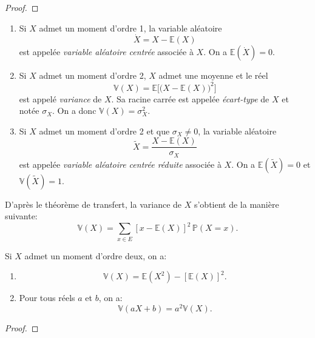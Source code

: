 \begin{proof}
		\pl{ \rep{5cm}}
	\end{proof}
\sld{\vfill\pagebreak[5]}%
\begin{definition}
\begin{enumerate}[label=(\roman*)]
	\item Si $X$ admet un moment d'ordre 1, la variable aléatoire 
		\[
		\dot{X} = X - \mathbb{E}(X)
	\]
	est appelée \emph{variable aléatoire centrée} associée à $X$. On a $\mathbb{E}(\dot{X})=0$.
	\item Si $X$ admet un moment d'ordre 2, $X$ admet une moyenne et le réel 
		\[
			\mathbb{V}(X) = \mathbb{E} \big[ \big( X-\mathbb{E}(X) \big)^2 \big]
		\]
		est appelé \emph{variance} de $X$. Sa racine carrée est appelée \emph{écart-type} de $X$ et notée $\sigma_X$. On a donc $\mathbb{V}(X)=\sigma_X^2$.
	 \item Si $X$ admet un moment d'ordre 2 et que $\sigma_X \neq 0$, la variable aléatoire 
		 \[
		 \tilde{X} = \frac{X - \mathbb{E}(X)}{\sigma_X}
	 \]
	 est appelée \emph{variable aléatoire centrée réduite} associée à $X$. On a $\mathbb{E}(\tilde{X})=0$ et $\mathbb{V}(\tilde{X})=1$.
\end{enumerate}
\end{definition}


D'après le théorème de transfert, la variance de $X$ s'obtient de la manière suivante:
\[\mathbb{V}(X)= \sum_{x \in E} [x-\mathbb{E}(X)]^2 \, \mathbb{P}(X=x).\]

\begin{proposition}
Si $X$ admet un moment d'ordre deux, on a:
\begin{enumerate}[label=$(\roman*)$]
	\item \[\mathbb{V}(X)= \mathbb{E}(X^2) - [\mathbb{E}(X)]^2 . \]
 \item Pour tous réels $a$ et $b$, on a:
 \[ \mathbb{V}(aX+b)=a^2 \mathbb{V}(X).\]
\end{enumerate}
\end{proposition}

\begin{proof}
	\pl{\rep{4cm}}
\end{proof}

